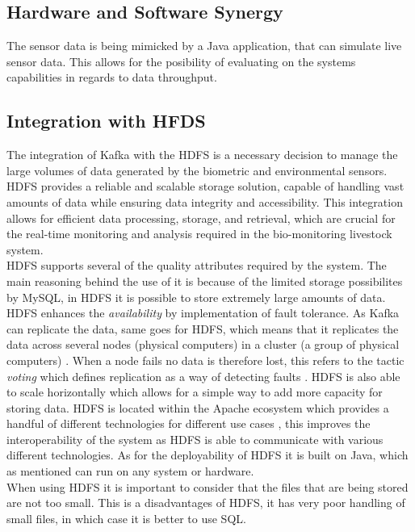 \subsection{\textbf{Hardware and Software Synergy}}
The sensor data is being mimicked by a Java application, that can simulate live sensor data. This allows for the posibility of evaluating on the systems capabilities in regards to data throughput.

\subsection{\textbf{Integration with HFDS}}
The integration of Kafka with the HDFS is a necessary decision to manage the large volumes of data generated by the biometric and environmental sensors. HDFS provides a reliable and scalable storage solution, capable of handling vast amounts of data while ensuring data integrity and accessibility. This integration allows for efficient data processing, storage, and retrieval, which are crucial for the real-time monitoring and analysis required in the bio-monitoring livestock system. \vspace{2mm} \\
HDFS supports several of the quality attributes required by the system. The main reasoning behind the use of it is because of the limited storage possibilites by MySQL, in HDFS it is possible to store extremely large amounts of data.
HDFS enhances the \textit{availability} by implementation of fault tolerance. As Kafka can replicate the data, same goes for HDFS, which means that it replicates the data across several nodes (physical computers) in a cluster (a group of physical computers) \cite{AltexSoft_2022a}. When a node fails no data is therefore lost, this refers to the tactic \textit{voting} which defines replication as a way of detecting faults \cite{Bass2012Software}.
HDFS is also able to scale horizontally which allows for a simple way to add more capacity for storing data. HDFS is located within the Apache ecosystem which provides a handful of different technologies for different use cases \cite{AltexSoft_2022a}, this improves the interoperability of the system as HDFS is able to communicate with various different technologies. As for the deployability of HDFS it is built on Java, which as mentioned can run on any system or hardware.\vspace{2mm} \\
When using HDFS it is important to consider that the files that are being stored are not too small. This is a disadvantages of HDFS, it has very poor handling of small files, in which case it is better to use SQL.
